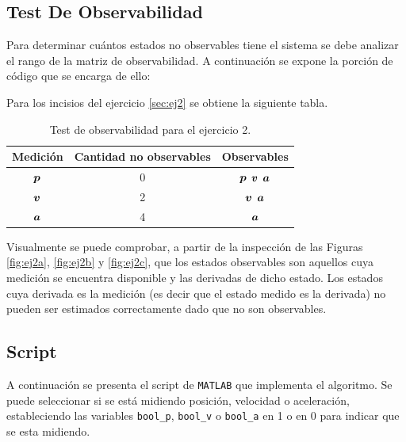 	\subsection{Test De Observabilidad}
		Para determinar cuántos estados no observables tiene el sistema se debe analizar el rango de la matriz de observabilidad. A continuación se expone la porción de código que se encarga de ello:
		

		Para los incisios del ejercicio \ref{sec:ej2} se obtiene la siguiente tabla.
		\begin{table}[h!]
			\centering
			\begin{tabular}{ccc}
				\toprule
				Medición	& Cantidad no observables	& Observables\\
				\midrule
				$\boldsymbol{p}$	& 0				& $\boldsymbol{p}$ $\boldsymbol{v}$ $\boldsymbol{a}$\\
				$\boldsymbol{v}$	& 2				& $\boldsymbol{v}$ $\boldsymbol{a}$ \\
				$\boldsymbol{a}$	& 4				& $\boldsymbol{a}$\\

				\bottomrule
			\end{tabular}
				\caption{Test de observabilidad para el ejercicio 2.}
				\label{tab:obs_ej2}
		\end{table}

		Visualmente se puede comprobar, a partir de la inspección de las Figuras \ref{fig:ej2a}, \ref{fig:ej2b} y \ref{fig:ej2c}, que los estados observables son aquellos cuya medición se encuentra disponible y las derivadas de dicho estado. Los estados cuya derivada es la medición (es decir que el estado medido es la derivada) no pueden ser estimados correctamente dado que no son observables.

	\subsection{Script}
	
	A continuación se presenta el script de \texttt{MATLAB} que implementa el algoritmo. Se puede seleccionar si se está midiendo posición, velocidad o aceleración, estableciendo las variables \texttt{bool\_p}, \texttt{bool\_v} o \texttt{bool\_a} en 1 o en 0 para indicar que se esta midiendo.\\
	
	
